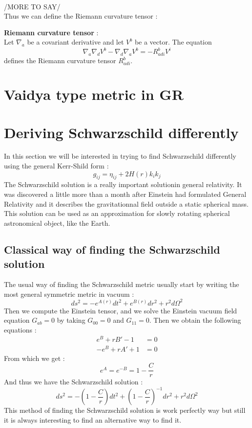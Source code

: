 \documentclass[a4paper,12pt]{article}
\theoremstyle{definition}
\begin{document}
\\/MORE TO SAY/\\
Thus we can define the Riemann curvature tensor :
\begin{definition}
	\textbf{Riemann curvature tensor} :\\
	Let $\nabla_a$ be a covariant derivative and let $V^b$ be a vector. The equation
	\begin{equation*}
		\nabla _a \nabla _d V^b - \nabla _d \nabla _aV^b=-R_{adi}^b V^i
	\end{equation*}
	defines the Riemann curvature tensor $R_{adi}^b$.
\end{definition}

\section{Vaidya type metric in GR}

\section{Deriving Schwarzschild differently}
In this section we will be interested in trying to find Schwarzschild differently using the general Kerr-Shild form :
\begin{equation*}
	g_{ij}=\eta_{ij}+2H(r)k_ik_j
\end{equation*}
The Schwarzschild solution is a really important solutionin general relativity. It was discovered a little more than a month after Einstein had formulated General Relativity and it describes the gravitationnal field outside a static spherical mass.
This solution can be used as an approximation for slowly rotating spherical astronomical object, like the Earth.
\subsection{Classical way of finding the Schwarzschild solution}
The usual way of finding the Schwarzschild metric usually start by writing the most general symmetric metric in vacuum :
\begin{equation*}
	ds^2=-e^{A(r)}dt^2+e^{B(r)}dr^2+r^2d\Omega^2
\end{equation*}
Then we compute the Einstein tensor, and we solve the Einstein vacuum field equation $G_{ab}=0$ by taking $G_{00}=0$ and $G_{11}=0$. Then we obtain the following equations :
\begin{align*}
	e^B+rB'-1&=0\\
	-e^B+rA'+1&=0
\end{align*}
From which we get :
\begin{equation*}
	e^A=e^{-B}=1-\frac{C}{r}
\end{equation*}
And thus we have the Schwarzschild solution :
\begin{equation*}
	ds^2=-(1-\frac{C}{r})dt^2+(1-\frac{C}{r})^{-1}dr^2+r^2d\Omega^2
\end{equation*}
This method of finding the Schwarzschild solution is work perfectly way but still it is always interesting to find an alternative way to find it.
\end{document}
